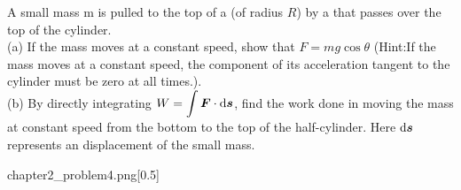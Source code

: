 \begin{example}
    A small mass m is pulled to the top of a   (of radius $R$) by a  that passes over the top of the cylinder.\\
    (a) If the mass moves at a constant speed, show that $F=mg\cos\theta$ (Hint:If the mass moves at a constant speed, the component of its acceleration tangent to the cylinder must be zero at all times.).\\
    (b) By directly integrating $\displaystyle W=\int \vec{F}\cdot \dif \vec{s}$, find the work done in moving the mass at constant speed from the bottom to the top of the half-cylinder. Here $\dif \vec{s}$ represents an  displacement of the small mass.

    \begin{singlefigure}[第五题图]{chapter2_problem4.png}[0.5]
    \end{singlefigure}
\end{example}